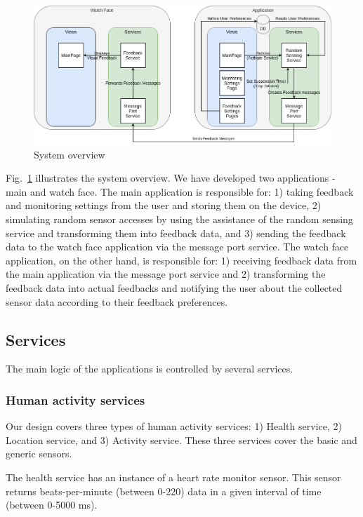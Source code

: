 \documentclass[conference, a4paper, 10pt, twocolumn]{IEEEtran}
\begin{document}
\begin{figure}[ht]
\centerline{\includegraphics[width=1\textwidth]{img/appDiagram.png}}
\caption{System overview}
\label{fig:systemOverview}
\end{figure}

Fig.~\ref{fig:systemOverview} illustrates the system overview. We have developed two applications - main and watch face. The main application is responsible for: 1) taking feedback and monitoring settings from the user and storing them on the device, 2) simulating random sensor accesses by using the assistance of the random sensing service and transforming them into feedback data, and 3) sending the feedback data to the watch face application via the message port service. The watch face application, on the other hand, is responsible for: 1) receiving feedback data from the main application via the message port service and 2) transforming the feedback data into actual feedbacks and notifying the user about the collected sensor data according to their feedback preferences.

\subsection{Services}
The main logic of the applications is controlled by several services.

\subsubsection{Human activity services}
Our design covers three types of human activity services: 1) Health service, 2) Location service, and 3) Activity service. These three services cover the basic and generic sensors.

The health service has an instance of a heart rate monitor sensor. This sensor returns beats-per-minute (between 0-220) data in a given interval of time (between 0-5000 ms).
\end{document}
